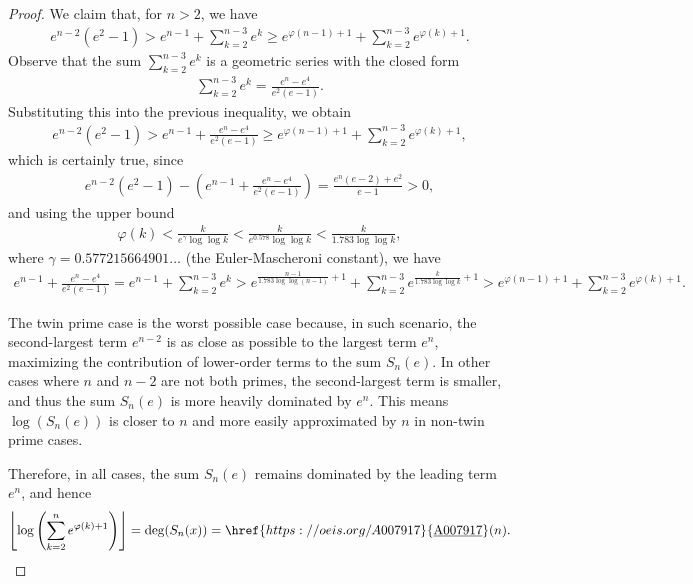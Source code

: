 \documentclass[10pt,a4paper]{article}
\theoremstyle{plain}
\newcommand{\floor}[1]{\left\lfloor #1 \right\rfloor}
\newcommand{\seqnum}[1]{\href{https://oeis.org/#1}{\rm \underline{#1}}}
\begin{document}
\begin{proof}
We claim that, for $n > 2$, we have
\begin{align*}
e^{n-2} (e^2-1) > e^{n-1} + \sum_{k=2}^{n-3} e^k \geq e^{\varphi(n-1)+1} + \sum_{k=2}^{n-3} e^{\varphi(k)+1}.
\end{align*}
Observe that the sum $\sum_{k=2}^{n-3} e^k$ is a geometric series with the closed form
\begin{align*}
\sum_{k=2}^{n-3} e^k = \frac{e^n-e^4}{e^2(e-1)} .
\end{align*}
Substituting this into the previous inequality, we obtain
\begin{align*}
e^{n-2} (e^2-1) > e^{n-1} + \frac{e^n-e^4}{e^2(e-1)} \geq e^{\varphi(n-1)+1} + \sum_{k=2}^{n-3} e^{\varphi(k)+1} ,
\end{align*}
which is certainly true, since
\begin{align*}
    e^{n-2} (e^2-1) - \left(e^{n-1} + \frac{e^n-e^4}{e^2(e-1)}\right) = \frac{e^n (e-2) + e^2}{e-1} > 0 ,
\end{align*}
and using the upper bound
\begin{align*}
    \varphi(k) < \frac{k}{e^{\gamma} \log\log k}
    < \frac{k}{e^{0.578} \log\log k}
    < \frac{k}{1.783 \log\log k} ,
\end{align*}
where $\gamma = 0.577215664901\ldots$ (the Euler-Mascheroni constant), we have 
\begin{align*}
    e^{n-1} + \frac{e^n-e^4}{e^2(e-1)} = e^{n-1} + \sum_{k=2}^{n-3} e^k
    > e^{\frac{n-1}{1.783 \log\log(n-1)}+1} + \sum_{k=2}^{n-3} e^{\frac{k}{1.783 \log\log k}+1}
    > e^{\varphi(n-1)+1} + \sum_{k=2}^{n-3} e^{\varphi(k)+1} .
\end{align*}

The twin prime case is the worst possible case because, in such scenario, the second-largest term $e^{n-2}$ is as close as possible to the largest term $e^n$, maximizing the contribution of lower-order terms to the sum $S_n(e)$. In other cases where $n$ and $n-2$ are not both primes, the second-largest term is smaller, and thus the sum $S_n(e)$ is more heavily dominated by $e^n$. This means $\log(S_n(e))$ is closer to $n$ and more easily approximated by $n$ in non-twin prime cases.

Therefore, in all cases, the sum $S_n(e)$ remains dominated by the leading term $e^n$, and hence
\begin{align*}
\floor{ \log\left( \sum_{k=2}^n e^{\varphi(k)+1} \right) } = \deg(S_n(x)) = \seqnum{A007917}(n) .
\end{align*}
\end{proof}
\end{document}
